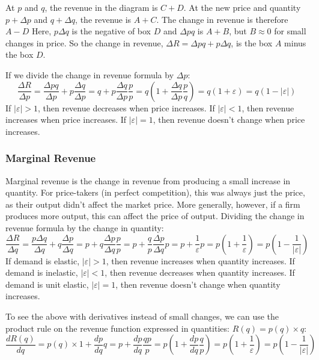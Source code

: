 \documentclass{article}
\begin{document}
  At $p$ and $q$, the revenue in the diagram is $C+D$. At the new price and quantity $p+\Delta p$ and $q+\Delta q$, the revenue is $A+C$. The change in revenue is therefore $A-D$ Here, $p\Delta q$ is the negative of box $D$ and $\Delta p q$ is $A+B$, but $B\approx 0$ for small changes in price. So the change in revenue, $\Delta R = \Delta p q + p \Delta q$, is the box $A$ minus the box $D$.

If we divide the change in revenue formula by $\Delta p$:
\[
  \frac{\Delta R}{\Delta p} = \frac{\Delta p q}{\Delta p} + p\frac{\Delta q}{\Delta p} = q + p\frac{\Delta q}{\Delta p}\frac{p}{p}=q\left( 1+\frac{\Delta q}{\Delta p}\frac{p}{q} \right)=q\left( 1+ \varepsilon\right)=q\left( 1-\left| \varepsilon \right| \right)
\]
If $\left| \varepsilon \right|>1$, then revenue decreases when price increases. If $\left| \varepsilon \right|<1$, then revenue increases when price increases. If $\left| \varepsilon \right|=1$, then revenue doesn't change when price increases.
\subsubsection*{Marginal Revenue}
Marginal revenue is the change in revenue from producing a small increase in quantity. For price-takers (in perfect competition), this was always just the price, as their output didn't affect the market price. More generally, however, if a firm produces more output, this can affect the price of output. Dividing the change in revenue formula by the change in quantity:
\[
  \frac{\Delta R}{\Delta q} = \frac{p\Delta q}{\Delta q} + q\frac{\Delta p}{\Delta q}=p+q\frac{\Delta p}{\Delta q}\frac{p}{p}=p+\frac{q}{p}\frac{\Delta p}{\Delta q}p = p + \frac{1}{\varepsilon}p=p\left( 1+\frac{1}{\varepsilon} \right)=p\left( 1-\frac{1}{\left| \varepsilon \right|} \right)
\]
If demand is elastic, $\left| \varepsilon \right|>1$, then revenue increases when quantity increases. If demand is inelastic, $\left| \varepsilon \right|<1$, then revenue decreases when quantity increases. If demand is unit elastic, $\left| \varepsilon \right|=1$, then revenue doesn't change when quantity increases.

To see the above with derivatives instead of small changes, we can use the product rule on the revenue function expressed in quantities: $R\left( q \right)=p\left( q \right)\times q$:
\[
  \frac{dR\left( q \right)}{dq}= p\left( q \right)\times 1 +\frac{dp}{dq}q =
  p + \frac{dp}{dq}\frac{qp}{p}= p\left( 1+ \frac{dp}{dq}\frac{q}{p}\right)=
  p\left( 1+\frac{1}{\varepsilon} \right)=p\left( 1-\frac{1}{\left| \varepsilon \right|} \right)
\]
\end{document}
